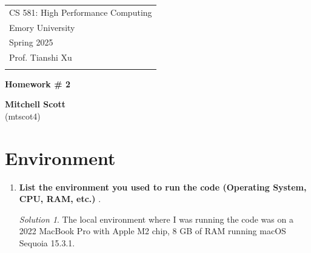 \documentclass[a4paper,12pt]{article}
\theoremstyle{definition}
\theoremstyle{remark}
\newtheorem*{solution}{Solution}
\begin{document}
	
	
	
	
	
	\thispagestyle{empty} %
	
	\begin{tabular}{p{15.5cm}} %
		{\large \sc CS 581:  High Performance Computing} \\
		Emory University \\ Spring 2025 \\ Prof. Tianshi Xu \\
		\hline %
		\\
	\end{tabular} %
	
	\vspace*{0.3cm} %
	
	\begin{center} %
		{\Large \bf Homework \# 2} %
		\vspace{2mm}
		
		{\bf Mitchell Scott}\\ (mtscot4) %
		
	\end{center}  
	
	\vspace{0.4cm}
	
	
	
	\section{Environment}
	\begin{enumerate}
		
		\item {\bf List the environment you used to run the code (Operating System, CPU, RAM, etc.) }. 
		
		\begin{solution}
			The local environment where I was running the code was on a 2022 MacBook Pro with Apple M2 chip, 8 GB of RAM running macOS Sequoia 15.3.1. 
		\end{solution}
	\end{enumerate}
\end{document}

